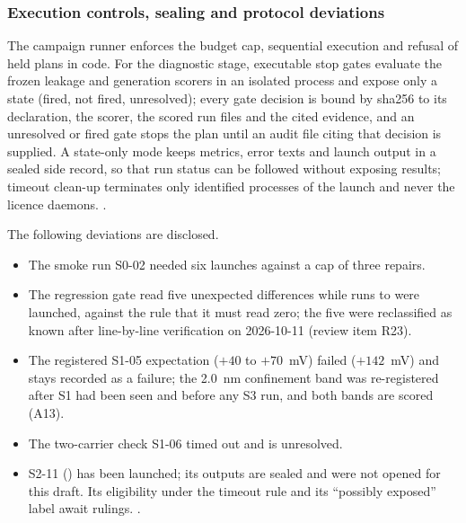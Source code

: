 \subsubsection{Execution controls, sealing and protocol deviations}
\label{sec:m-tcad-controls}

The campaign runner enforces the budget cap, sequential execution and refusal of held plans in code. %
For the diagnostic stage, executable stop gates evaluate the frozen leakage and generation scorers in an isolated
process and expose only a state (fired, not fired, unresolved); every gate decision is bound by sha256 to its
declaration, the scorer, the scored run files and the cited evidence, and an unresolved or fired gate stops the plan
until an audit file citing that decision is supplied. %
A state-only mode keeps metrics, error texts and launch output in a sealed side record, so that run status can be
followed without exposing results; timeout clean-up terminates only identified processes of the launch and never the
licence daemons. %
. %

The following deviations are disclosed.
\begin{itemize}
\item The smoke run S0-02 needed six launches against a cap of three repairs. %
\item The regression gate read five unexpected differences while runs  to  were launched, against
the rule that it must read zero; the five were reclassified as known after line-by-line verification on 2026-10-11
(review item R23). %
\item The registered S1-05 expectation ($+40$ to $+70$~mV) failed ($+142$~mV) and stays recorded as a failure; the
\SI{2.0}{nm} confinement band was re-registered after S1 had been seen and before any S3 run, and both bands are scored
(A13). %
\item The two-carrier check S1-06 timed out and is unresolved. %
\item S2-11 () has been launched; its outputs are sealed and were not opened for this draft. Its eligibility
under the timeout rule and its ``possibly exposed'' label await rulings. %
.
\end{itemize}

